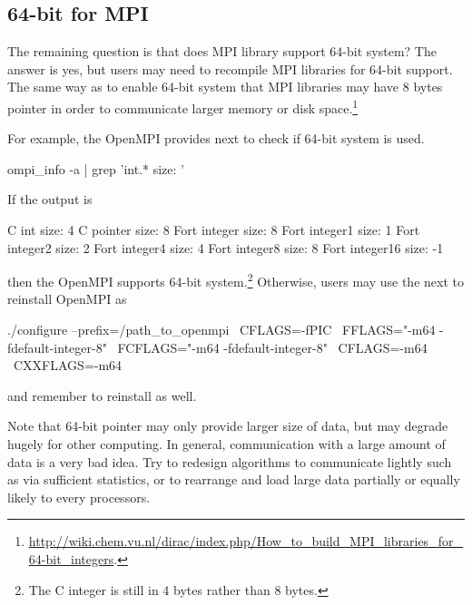 \subsection{64-bit for MPI}

The remaining question is that does MPI library support 64-bit system?
The answer is yes, but users may need to recompile MPI libraries for
64-bit support.
The same way as  to enable 64-bit system that MPI libraries
may have 8 bytes pointer in order to communicate larger memory or disk
space.\footnote{
\url{http://wiki.chem.vu.nl/dirac/index.php/How_to_build_MPI_libraries_for_64-bit_integers}.
}

For example, the OpenMPI provides next to check if 64-bit system is used.
\begin{Command}
ompi_info -a | grep 'int.* size: '
\end{Command}
If the output is
\begin{Command}
              C int size: 4
          C pointer size: 8
       Fort integer size: 8
      Fort integer1 size: 1
      Fort integer2 size: 2
      Fort integer4 size: 4
      Fort integer8 size: 8
     Fort integer16 size: -1
\end{Command}
then the OpenMPI supports 64-bit system.\footnote{
\color{red}
The C integer is still in 4 bytes rather than 8 bytes.
}
Otherwise, users may use the next to reinstall OpenMPI as
\begin{Command}
./configure --prefix=/path_to_openmpi \
            CFLAGS=-fPIC \
            FFLAGS="-m64 -fdefault-integer-8" \
            FCFLAGS="-m64 -fdefault-integer-8" \
            CFLAGS=-m64 \
            CXXFLAGS=-m64
\end{Command}
and remember to reinstall \pkg{pbdMPI} as well.

Note that 64-bit pointer may only provide larger size of data, but
may degrade hugely for other computing. In general, communication with a
large amount of data is a very bad idea. Try to redesign algorithms to
communicate lightly such as via sufficient statistics, or to rearrange and
load large data partially or equally likely to every processors.
